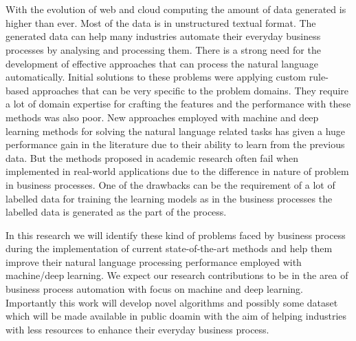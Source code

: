 \makeatletter
\renewenvironment{abstract}{%
    \if@twocolumn
      \section*{\abstractname}%
    \else %
      \begin{center}%
        {\bfseries \Large\abstractname\vspace{\z@}}%
      \end{center}%
      \quotation
    \fi}
    {\if@twocolumn\else\endquotation\fi}
\makeatother

\begin{abstract}

With the evolution of web and cloud computing the amount of data generated is higher than ever. Most of the data is in unstructured textual format. The generated data can help many industries automate their everyday business processes by analysing and processing them. There is a strong need for the development of effective approaches that can process the natural language automatically. Initial solutions to these problems were applying custom rule-based approaches that can be very specific to the problem domains. They require a lot of domain expertise for crafting the features and the performance with these methods was also poor. New approaches employed with machine and deep learning methods for solving the natural language related tasks has given a huge performance gain in the literature due to their ability to learn from the previous data. But the methods proposed in academic research often fail when implemented in real-world applications due to the difference in nature of problem in business processes. One of the drawbacks can be the requirement of a lot of labelled data for training the learning models as in the business processes the labelled data is generated as the part of the process.

In this research we will identify these kind of problems faced by business process during the implementation of current state-of-the-art methods and help them improve their natural language processing performance employed with machine/deep learning. We expect our research contributions to be in the area of business process automation with focus on machine and deep learning. Importantly this work will develop novel algorithms and possibly some dataset which will be made available in public doamin with the aim of helping industries with less resources to enhance their everyday business process.

\end{abstract} 